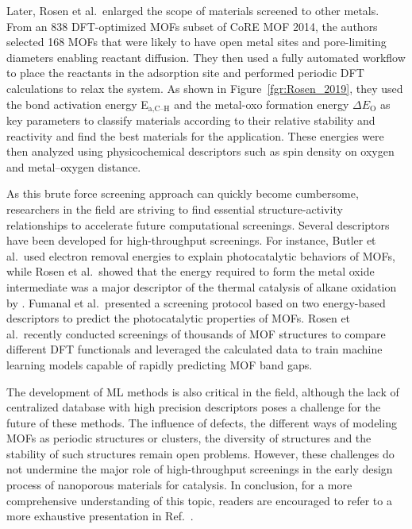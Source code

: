 \documentclass[main.tex]{subfiles}
\begin{document}
Later, Rosen et al.\ enlarged the scope of materials screened to other metals.\autocite{Rosen_2019} From an 838 DFT-optimized MOFs subset of CoRE MOF 2014, the authors selected 168 MOFs that were likely to have open metal sites and pore-limiting diameters enabling reactant diffusion. They then used a fully automated workflow to place the reactants in the adsorption site and performed periodic DFT calculations to relax the system. As shown in Figure~\ref{fgr:Rosen_2019}, they used the bond activation energy E$_\text{a,C--H}$ and the metal-oxo formation energy $\Delta E_\text{O}$ as key parameters to classify materials according to their relative stability and reactivity and find the best materials for the application. These energies were then analyzed using physicochemical descriptors such as spin density on oxygen and metal--oxygen distance.

As this brute force screening approach can quickly become cumbersome, researchers in the field are striving to find essential structure-activity relationships to accelerate future computational screenings.
Several descriptors have been developed for high-throughput screenings. For instance, Butler et al.\ used electron removal energies to explain photocatalytic behaviors of MOFs,\autocite{Butler_2014} while Rosen et al.\ showed that the energy required to form the metal oxide intermediate was a major descriptor of the thermal catalysis of alkane oxidation by .\autocite{Rosen_HTPDFT_2019} Fumanal et al.\ presented a screening protocol based on two energy-based descriptors to predict the photocatalytic properties of MOFs.\autocite{Fumanal_descriptor_2020} {Rosen et al.\ recently conducted screenings of thousands of MOF structures to compare different DFT functionals and leveraged the calculated data to train machine learning models capable of rapidly predicting MOF band gaps.\autocite{Rosen_2022_high} } 

The development of ML methods is also critical in the field,\autocite{Rosen_2021} although the lack of centralized database with high precision descriptors poses a challenge for the future of these methods. The influence of defects, the different ways of modeling MOFs as periodic structures or clusters, the diversity of structures and the stability of such structures remain open problems. However, these challenges do not undermine the major role of high-throughput screenings in the early design process of nanoporous materials for catalysis. In conclusion, for a more comprehensive understanding of this topic, readers are encouraged to refer to a more exhaustive presentation in Ref.~\autocite{Rosen_2022}.
\end{document}
